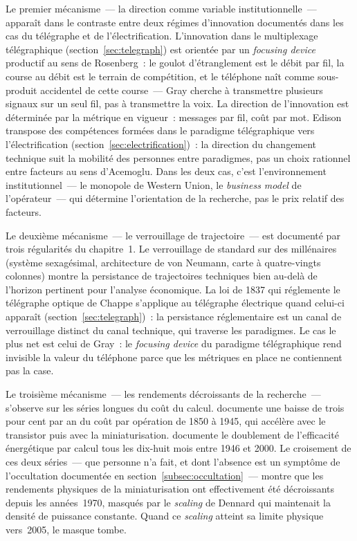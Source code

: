 Le premier mécanisme~--- la direction comme variable institutionnelle~--- apparaît dans le contraste entre deux régimes d'innovation documentés dans les cas du télégraphe et de l'électrification. L'innovation dans le multiplexage télégraphique (section~\ref{sec:telegraph}) est orientée par un \emph{focusing device} productif au sens de Rosenberg~: le goulot d'étranglement est le débit par fil, la course au débit est le terrain de compétition, et le téléphone naît comme sous-produit accidentel de cette course~--- Gray cherche à transmettre plusieurs signaux sur un seul fil, pas à transmettre la voix. La direction de l'innovation est déterminée par la métrique en vigueur~: messages par fil, coût par mot. Edison transpose des compétences formées dans le paradigme télégraphique vers l'électrification (section~\ref{sec:electrification})~: la direction du changement technique suit la mobilité des personnes entre paradigmes, pas un choix rationnel entre facteurs au sens d'Acemoglu. Dans les deux cas, c'est l'environnement institutionnel~--- le monopole de Western Union, le \emph{business model} de l'opérateur~--- qui détermine l'orientation de la recherche, pas le prix relatif des facteurs.

Le deuxième mécanisme~--- le verrouillage de trajectoire~--- est documenté par trois régularités du chapitre~1. Le verrouillage de standard sur des millénaires (système sexagésimal, architecture de von Neumann, carte à quatre-vingts colonnes) montre la persistance de trajectoires techniques bien au-delà de l'horizon pertinent pour l'analyse économique. La loi de 1837 qui réglemente le télégraphe optique de Chappe s'applique au télégraphe électrique quand celui-ci apparaît (section~\ref{sec:telegraph})~: la persistance réglementaire est un canal de verrouillage distinct du canal technique, qui traverse les paradigmes. Le cas le plus net est celui de Gray~: le \emph{focusing device} du paradigme télégraphique rend invisible la valeur du téléphone parce que les métriques en place ne contiennent pas la case.

Le troisième mécanisme~--- les rendements décroissants de la recherche~--- s'observe sur les séries longues du coût du calcul. \textcite{nordhaus_two_2007} documente une baisse de trois pour cent par an du coût par opération de 1850 à 1945, qui accélère avec le transistor puis avec la miniaturisation. \textcite{koomey_implications_2011} documente le doublement de l'efficacité énergétique par calcul tous les dix-huit mois entre 1946 et 2000. Le croisement de ces deux séries~--- que personne n'a fait, et dont l'absence est un symptôme de l'occultation documentée en section~\ref{subsec:occultation}~--- montre que les rendements physiques de la miniaturisation ont effectivement été décroissants depuis les années~1970, masqués par le \emph{scaling} de Dennard qui maintenait la densité de puissance constante. Quand ce \emph{scaling} atteint sa limite physique vers~2005, le masque tombe.


